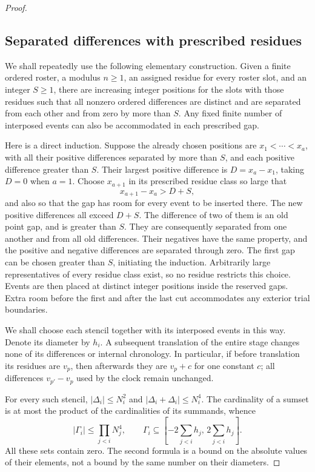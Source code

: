 \begin{proof}
\subsection*{Separated differences with prescribed residues}
We shall repeatedly use the following elementary construction.
Given a finite ordered roster, a modulus \(n\ge1\), an assigned residue
for every roster slot, and an integer \(S\ge1\), there are increasing
integer positions for the slots with those residues such that all
nonzero ordered differences are distinct and are separated from each
other and from zero by more than \(S\).  Any fixed finite number of
interposed events can also be accommodated in each prescribed gap.

Here is a direct induction.  Suppose the already chosen positions are
\(x_1<\cdots<x_a\), with all their positive differences separated by
more than \(S\), and each positive difference greater than \(S\).
Their largest positive difference is \(D=x_a-x_1\), taking \(D=0\)
when \(a=1\).  Choose \(x_{a+1}\) in its prescribed residue class so
large that
\[
 x_{a+1}-x_a>D+S,
\]
and also so that the gap has room for every event to be inserted
there.  The new positive differences all exceed \(D+S\).  The
difference of two of them is an old point gap, and is greater than
\(S\).  They are consequently separated from one another and from all
old differences.  Their negatives have the same property, and the
positive and negative differences are separated through zero.
The first gap can be chosen greater than \(S\), initiating the
induction.  Arbitrarily large representatives of every residue class
exist, so no residue restricts this choice.  Events are then placed
at distinct integer positions inside the reserved gaps.  Extra room
before the first and after the last cut accommodates any exterior
trial boundaries.

We shall choose each stencil together with its interposed events in
this way.  Denote its diameter by \(h_i\).  A subsequent translation
of the entire stage changes none of its differences or internal
chronology.  In particular, if before translation its residues are
\(v_p\), then afterwards they are \(v_p+c\) for one constant \(c\);
all differences \(v_{p'}-v_p\) used by the clock remain unchanged.

For every such stencil,
\( |\Delta_i|\le N_i^2\) and
\( |\Delta_i+\Delta_i|\le N_i^4\).
The cardinality of a sumset is at most the product of the
cardinalities of its summands, whence
\begin{equation}\label{eq:parameter-gamma-size}
 |\Gamma_i|\le\prod_{j<i}N_j^4,
 \qquad
 \Gamma_i\subseteq
 \left[-2\sum_{j<i}h_j,\,2\sum_{j<i}h_j\right].
\end{equation}
All these sets contain zero.  The second formula is a bound on the
absolute values of their elements, not a bound by the same number on
their diameters.


\end{proof}
